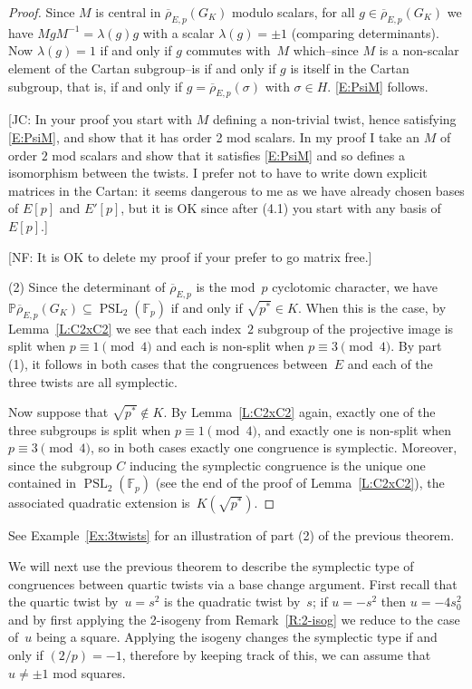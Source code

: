 \documentclass[12pt, reqno]{amsart}
\newcommand{\F}{\mathbb{F}}
\newcommand{\PP}{\mathbb{P}}
\newcommand{\rhobar}{{\overline{\rho}}}
\newcommand{\PSL}{\operatorname{PSL}}
\numberwithin{equation}{section}
\theoremstyle{definition}
\theoremstyle{remark}
\newcommand{\nf}[1]{{\color{blue} \textsf{[NF: #1]}}}
\newcommand{\jc}[1]{{\color{darkgreen} \textsf{[JC: #1]}}}
\begin{document}
\begin{proof}
Since $M$ is central in $\rhobar_{E,p}(G_K)$ modulo scalars, for all
$g\in\rhobar_{E,p}(G_K)$ we have $MgM^{-1}=\lambda(g)g$ with a scalar
$\lambda(g)=\pm1$ (comparing determinants).  Now $\lambda(g)=1$ if and
only if $g$ commutes with~$M$ which--since $M$ is a non-scalar element
of the Cartan subgroup--is if and only if $g$ is itself in the Cartan
subgroup, that is, if and only if $g=\rhobar_{E,p}(\sigma)$ with
$\sigma\in H$.  \eqref{E:PsiM} follows.

\jc{In your proof you start with $M$ defining a non-trivial twist,
  hence satisfying \eqref{E:PsiM}, and show that it has order 2 mod
  scalars.  In my proof I take an $M$ of order $2$ mod scalars and
  show that it satisfies \eqref{E:PsiM} and so defines a isomorphism
  between the twists.  I prefer not to have to write down explicit
  matrices in the Cartan: it seems dangerous to me as we have already
  chosen bases of $E[p]$ and $E'[p]$, but it is OK since after (4.1)
  you start with any basis of $E[p]$.}
  
  \nf{It is OK to delete my proof if your prefer to go matrix free.}

(2) Since the determinant of $\rhobar_{E,p}$ is the mod~$p$ cyclotomic
character, we have $\PP\rhobar_{E,p}(G_K)\subseteq \PSL_2(\F_p)$ if
and only if $\sqrt{p^*}\in K$.  When this is the case, by
Lemma~\ref{L:C2xC2} we see that each index~$2$ subgroup of the
projective image is split when $p\equiv1\pmod4$ and each is non-split
when $p\equiv3\pmod4$.  By part (1), it follows in both cases that the
congruences between~$E$ and each of the three twists are all
symplectic.

Now suppose that $\sqrt{p^*}\notin K$.  By Lemma~\ref{L:C2xC2} again,
exactly one of the three subgroups is split when $p\equiv1\pmod4$, and
exactly one is non-split when $p\equiv3\pmod4$, so in both cases
exactly one congruence is symplectic.  Moreover, since the subgroup
$C$ inducing the symplectic congruence is the unique one contained in
$\PSL_2(\F_p)$ (see the end of the proof of Lemma~\ref{L:C2xC2}), the
associated quadratic extension is~$K(\sqrt{p^*})$.
\end{proof}

See Example~\ref{Ex:3twists} for an illustration of part (2) of
the previous theorem.


We will next use the previous theorem to describe the symplectic type
of congruences between quartic twists via a base change
argument. First recall that the quartic twist by~$u = s^2$ is the
quadratic twist by~$s$; if $u = -s^2$ then $u = -4s_0^2$ and by first
applying the 2-isogeny from Remark~\ref{R:2-isog} we reduce to the
case of~$u$ being a square. Applying the isogeny changes the
symplectic type if and only if $(2/p) = -1$, therefore by keeping
track of this, we can assume that $u \neq \pm 1$ mod squares.
\end{document}
